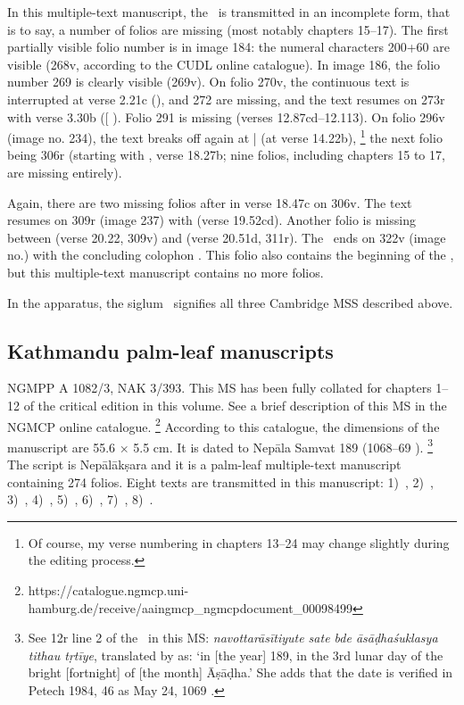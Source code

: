 In this multiple-text manuscript, the \VSS\ is transmitted in an incomplete
form, that is to say, a number of folios are missing (most notably
chapters 15--17). The first partially visible folio number is in image
184: the numeral characters 200+60 are visible (268v, according to the
CUDL online catalogue). In image 186, the folio number 269 is clearly
visible (\fol269v). On folio 270v, the continuous text is interrupted at verse
2.21c (),  and 272 are missing, and the text
resumes on \fol273r with verse 3.30b ({[}\skt{ahiṃsā
pa}{]} ). Folio 291 is missing (verses
12.87cd--12.113). On folio 296v (image no. 234), the text breaks off
again at  |  (at verse 14.22b),%
        \footnote{Of course, my verse numbering in chapters 13--24 may change slightly
                  during the editing process.}
the next folio being 306r (starting with ,
verse 18.27b; nine folios, including chapters 15 to 17, are missing entirely).

Again, there are two missing folios after  in
verse 18.47c on \fol306v. The text resumes on \fol309r (image 237)
with  (verse 19.52cd). 
Another folio is missing between  (verse
20.22, \fol309v) and  (verse 20.51d, \fol311r). The \VSS\ ends on \fol322v (image no.) with the
concluding colophon . 
This folio also contains the beginning of the , 
but this multiple-text manuscript contains no more folios.

In the apparatus, the siglum \mssCaCbCc\ signifies all three Cambridge 
MSS described above.

\medskip
\subsection{Kathmandu palm-leaf manuscripts}
NGMPP A 1082/3, NAK 3/393. This MS has been fully 
collated for chapters 1--12 of the critical edition in this volume. 
See a brief description of this MS in
the NGMCP online catalogue.%
	\footnote{https://catalogue.ngmcp.uni-hamburg.de/receive/aaingmcp\_ngmcpdocument\_00098499}
According to this catalogue, the dimensions of the 
manuscript are 55.6 × 5.5 cm. 
It is dated to Nepāla Samvat 189 (1068--69 \CE).%
	\footnote{See \fol12r line 2 of the 
	\DharmP\ in this MS: 
	\emph{navottarāsītiyute sate bde āsāḍhaśuklasya
  tithau tṛtīye}, translated by  as: 
  `in {[}the year{]} 189, in the 3rd lunar day of the bright {[}fortnight{]}
  of {[}the month{]} Āṣāḍha.' She adds that the date is verified in
  Petech 1984, 46 as May 24, 1069 \CE.} The script is Nepālākṣara and it is
a palm-leaf multiple-text manuscript containing 274 folios. Eight texts
are transmitted in this manuscript: 
1)~\SDhS,
2)~\SDhU,
3)~\SDhSangr,
4)~\Ums,
5)~\SivaUp,
6)~\Vss,
7)~\DharmP,
8)~\Uums.

